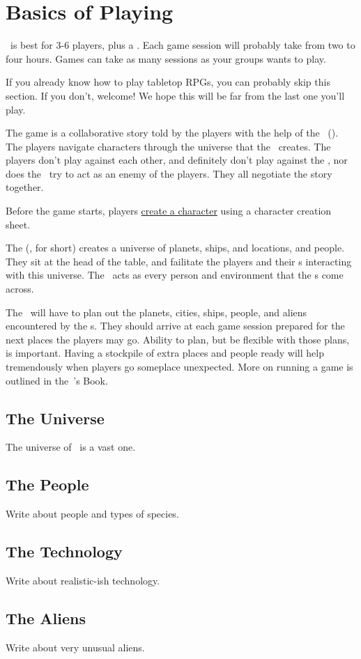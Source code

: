\section{Basics of Playing}

\par
\getTitle\, is best for 3-6 players, plus a \gm . Each game session will probably take from two to four hours. Games can take as many sessions as your groups wants to play.

\par
If you already know how to play tabletop RPGs, you can probably skip this section. If you don't, welcome! We hope this will be far from the last one you'll play.

\par
The game is a collaborative story told by the players with the help of the \gmLong\, (\gm). The players navigate characters through the universe that the \gm\, creates. The players don't play against each other, and definitely don't play against the \gm , nor does the \gm\, try to act as an enemy of the players. They all negotiate the story together.

\par
Before the game starts, players \hyperlink{Character Creation}{create a character} using a character creation sheet.

\par
The \gmLong (\gm , for short) creates a universe of planets, ships, and locations, and people. They sit at the head of the table, and failitate the players and their \pc s interacting with this universe. The \gm\, acts as every person and environment that the \pc s come across.

\par
The \gm\, will have to plan out the planets, cities, ships, people, and aliens encountered by the \pc s. They should arrive at each game session prepared for the next places the players may go. Ability to plan, but be flexible with those plans, is important. Having a stockpile of extra places and people ready will help tremendously when players go someplace unexpected. More on running a game is outlined in the \getTitle\,\gm 's Book.

\subsection{The Universe}

\par
The universe of \getTitle\, is a vast one.

\subsection{The People}

\par
Write about people and types of species.

\subsection{The Technology}

Write about realistic-ish technology.

\subsection{The Aliens}

Write about very unusual aliens.
